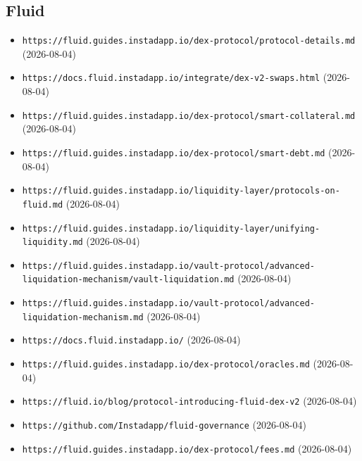 \subsection*{Fluid}
\begin{itemize}\setlength{\itemsep}{0pt}\small
\item \texttt{https://fluid.guides.instadapp.io/dex-protocol/protocol-details.md} (2026-08-04)
\item \texttt{https://docs.fluid.instadapp.io/integrate/dex-v2-swaps.html} (2026-08-04)
\item \texttt{https://fluid.guides.instadapp.io/dex-protocol/smart-collateral.md} (2026-08-04)
\item \texttt{https://fluid.guides.instadapp.io/dex-protocol/smart-debt.md} (2026-08-04)
\item \texttt{https://fluid.guides.instadapp.io/liquidity-layer/protocols-on-fluid.md} (2026-08-04)
\item \texttt{https://fluid.guides.instadapp.io/liquidity-layer/unifying-liquidity.md} (2026-08-04)
\item \texttt{https://fluid.guides.instadapp.io/vault-protocol/advanced-liquidation-mechanism/vault-liquidation.md} (2026-08-04)
\item \texttt{https://fluid.guides.instadapp.io/vault-protocol/advanced-liquidation-mechanism.md} (2026-08-04)
\item \texttt{https://docs.fluid.instadapp.io/} (2026-08-04)
\item \texttt{https://fluid.guides.instadapp.io/dex-protocol/oracles.md} (2026-08-04)
\item \texttt{https://fluid.io/blog/protocol-introducing-fluid-dex-v2} (2026-08-04)
\item \texttt{https://github.com/Instadapp/fluid-governance} (2026-08-04)
\item \texttt{https://fluid.guides.instadapp.io/dex-protocol/fees.md} (2026-08-04)
\end{itemize}

